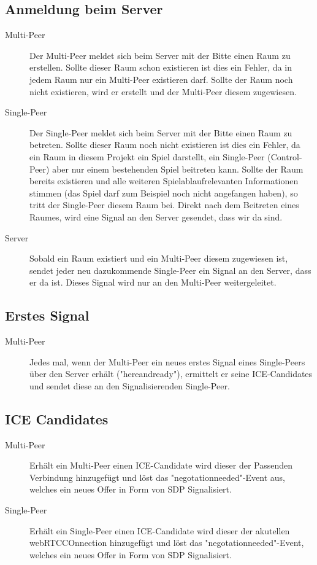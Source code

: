\subsection{Anmeldung beim Server}
\begin{description}
\item[Multi-Peer]
Der Multi-Peer meldet sich beim Server mit der Bitte einen Raum zu erstellen. Sollte dieser Raum schon existieren ist dies ein Fehler, da in jedem Raum nur ein Multi-Peer existieren darf. Sollte der Raum noch nicht existieren, wird er erstellt und der Multi-Peer diesem zugewiesen.

\item[Single-Peer]
Der Single-Peer meldet sich beim Server mit der Bitte einen Raum zu betreten. Sollte dieser Raum noch nicht existieren ist dies ein Fehler, da ein Raum in diesem Projekt ein Spiel darstellt, ein Single-Peer (Control-Peer) aber nur einem bestehenden Spiel beitreten kann. Sollte der Raum bereits existieren und alle weiteren Spielablaufrelevanten Informationen stimmen (das Spiel darf zum Beispiel noch nicht angefangen haben), so tritt der Single-Peer diesem Raum bei. Direkt nach dem Beitreten eines Raumes, wird eine Signal an den Server gesendet, dass wir da sind.

\item[Server]
Sobald ein Raum existiert und ein Multi-Peer diesem zugewiesen ist, sendet jeder neu dazukommende Single-Peer ein Signal an den Server, dass er da ist. Dieses Signal wird nur an den Multi-Peer weitergeleitet.
\end{description}

\subsection{Erstes Signal}
\begin{description}
\item[Multi-Peer]
Jedes mal, wenn der Multi-Peer ein neues erstes Signal eines Single-Peers über den Server erhält ("hereandready"), ermittelt er seine ICE-Candidates und sendet diese an den Signalisierenden Single-Peer.
\end{description}

\subsection{ICE Candidates}
\begin{description}
\item[Multi-Peer]
Erhält ein Multi-Peer einen ICE-Candidate wird dieser der Passenden Verbindung hinzugefügt und löst das "negotationneeded"-Event aus, welches ein neues Offer in Form von SDP Signalisiert.

\item[Single-Peer]
Erhält ein Single-Peer einen ICE-Candidate wird dieser der akutellen webRTCCOnnection hinzugefügt und löst das "negotationneeded"-Event, welches ein neues Offer in Form von SDP Signalisiert.
\end{description}

